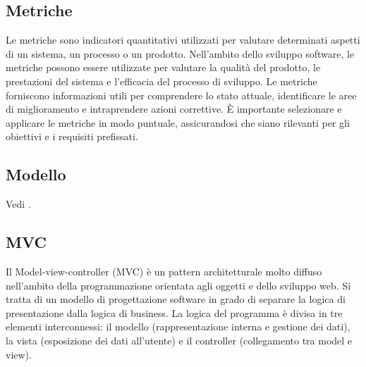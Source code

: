 \vspace{2em}
\subsection*{Metriche}
\par Le metriche sono indicatori quantitativi utilizzati per valutare determinati aspetti di un sistema, un processo o un prodotto. Nell'ambito dello sviluppo software, le metriche possono essere utilizzate per valutare la qualità del prodotto, le prestazioni del sistema e l'efficacia del processo di sviluppo. Le metriche forniscono informazioni utili per comprendere lo stato attuale, identificare le aree di miglioramento e intraprendere azioni correttive. È importante selezionare e applicare le metriche in modo puntuale, assicurandosi che siano rilevanti per gli obiettivi e i requisiti prefissati.

\vspace{2em}
\subsection*{Modello}
\par Vedi .

\vspace{2em}
\subsection*{MVC}
\par Il Model-view-controller (MVC) è un pattern architetturale molto diffuso nell'ambito della programmazione orientata agli oggetti e dello sviluppo web. Si tratta di un modello di progettazione software in grado di separare la logica di presentazione dalla logica di business. La logica del programma è divisa in tre elementi interconnessi: il modello (rappresentazione interna e gestione dei dati), la vista (esposizione dei dati all'utente) e il controller (collegamento tra model e view).
